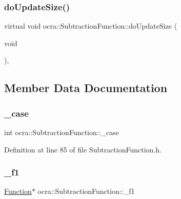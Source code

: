 \hypertarget{classocra_1_1SubtractionFunction_abeccbd4ec6cabf7bf18169e052a993d5}{}\label{classocra_1_1SubtractionFunction_abeccbd4ec6cabf7bf18169e052a993d5} 
\subsubsection{\texorpdfstring{do\+Update\+Size()}{doUpdateSize()}}
{\footnotesize\ttfamily virtual void ocra\+::\+Subtraction\+Function\+::do\+Update\+Size (\begin{DoxyParamCaption}\item[{void}]{ }\end{DoxyParamCaption})\hspace{0.3cm}{\ttfamily [protected]}, {\ttfamily [virtual]}}



\subsection{Member Data Documentation}
\hypertarget{classocra_1_1SubtractionFunction_a2acdf28df1d3018d7c25cb8b16c879d1}{}\label{classocra_1_1SubtractionFunction_a2acdf28df1d3018d7c25cb8b16c879d1} 
\subsubsection{\texorpdfstring{\+\_\+case}{\_case}}
{\footnotesize\ttfamily int ocra\+::\+Subtraction\+Function\+::\+\_\+case\hspace{0.3cm}{\ttfamily [protected]}}



Definition at line 85 of file Subtraction\+Function.\+h.

\hypertarget{classocra_1_1SubtractionFunction_a9adc6a235a48bdf90fe1ad4d4a18b7a0}{}\label{classocra_1_1SubtractionFunction_a9adc6a235a48bdf90fe1ad4d4a18b7a0} 
\subsubsection{\texorpdfstring{\+\_\+f1}{\_f1}}
{\footnotesize\ttfamily \hyperlink{classocra_1_1Function}{Function}$\ast$ ocra\+::\+Subtraction\+Function\+::\+\_\+f1\hspace{0.3cm}{\ttfamily [protected]}}



